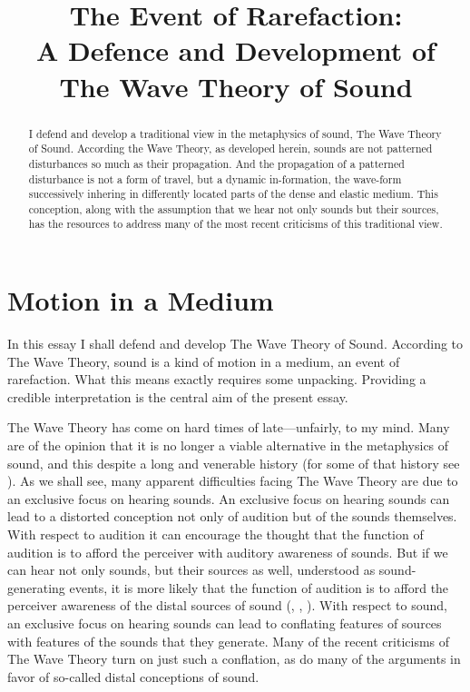 \documentclass[12pt]{article}
\title{The Event of Rarefaction:\\A Defence and Development of The Wave Theory of Sound}
\author{\myauthor}
\date{} %
\begin{document}
\maketitle
\begin{abstract} %
\noindent I defend and develop a traditional view in the metaphysics of sound, The Wave Theory of Sound. According the Wave Theory, as developed herein, sounds are not patterned disturbances so much as their propagation. And the propagation of a patterned disturbance is not a form of travel, but a dynamic in-formation, the wave-form successively inhering in differently located parts of the dense and elastic medium. This conception, along with the assumption that we hear not only sounds but their sources, has the resources to address many of the most recent criticisms of this traditional view.
\end{abstract}

\setlength{\parindent}{1em}


\section{Motion in a Medium} %
\label{sec:motion_in_a_medium}

In this essay I shall defend and develop The Wave Theory of Sound. According to The Wave Theory, sound is a kind of motion in a medium, an event of rarefaction. What this means exactly requires some unpacking. Providing a credible interpretation is the central aim of the present essay.

The Wave Theory has come on hard times of late---unfairly, to my mind. Many are of the opinion that it is no longer a viable alternative in the metaphysics of sound, and this despite a long and venerable history (for some of that history see \citealt{Pasnau:2000aa}). As we shall see, many apparent difficulties facing The Wave Theory are due to an exclusive focus on hearing sounds. An exclusive focus on hearing sounds can lead to a distorted conception not only of audition but of the sounds themselves. With respect to audition it can encourage the thought that the function of audition is to afford the perceiver with auditory awareness of sounds. But if we can hear not only sounds, but their sources as well, understood as sound-generating events, it is more likely that the function of audition is to afford the perceiver awareness of the distal sources of sound (\citealt{Nudds:2009sf}, \citealt{Leddington:2014aa}, \citealt[chapter 4]{Kalderon:2018oe}). With respect to sound, an exclusive focus on hearing sounds can lead to conflating features of sources with features of the sounds that they generate. Many of the recent criticisms of The Wave Theory turn on just such a conflation, as do many of the arguments in favor of so-called distal conceptions of sound.
\end{document}
